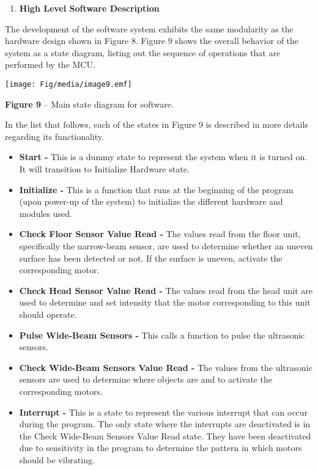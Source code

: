 \begin{enumerate}
\def\labelenumi{\arabic{enumi}.}
\setcounter{enumi}{1}
\item
  \textbf{High Level Software Description}
\end{enumerate}

The development of the software system exhibits the same modularity as
the hardware design shown in Figure 8. Figure 9 shows the overall
behavior of the system as a state diagram, listing out the sequence of
operations that are performed by the MCU.

\texttt{[image: Fig/media/image9.emf]}

\textbf{Figure 9} -- Main state diagram for software.

In the list that follows, each of the states in Figure 9 is described in
more details regarding its functionality.

\begin{itemize}
\item
  \textbf{Start -} This is a dummy state to represent the system when it
  is turned on. It will transition to Initialize Hardware state.
\item
  \textbf{Initialize -} This is a function that runs at the beginning of
  the program (upon power-up of the system) to initialize the different
  hardware and modules used.
\item
  \textbf{Check Floor Sensor Value Read -} The values read from the
  floor unit, specifically the narrow-beam sensor, are used to determine
  whether an uneven surface has been detected or not. If the surface is
  uneven, activate the corresponding motor.
\item
  \textbf{Check Head Sensor Value Read -} The values read from the head
  unit are used to determine and set intensity that the motor
  corresponding to this unit should operate.
\item
  \textbf{Pulse Wide-Beam Sensors -} This calls a function to pulse the
  ultrasonic sensors.
\item
  \textbf{Check Wide-Beam Sensors Value Read -} The values from the
  ultrasonic sensors are used to determine where objects are and to
  activate the corresponding motors.
\item
  \textbf{Interrupt -} This is a state to represent the various
  interrupt that can occur during the program. The only state where the
  interrupts are deactivated is in the Check Wide-Beam Sensors Value
  Read state. They have been deactivated due to sensitivity in the
  program to determine the pattern in which motors should be vibrating.
\end{itemize}

